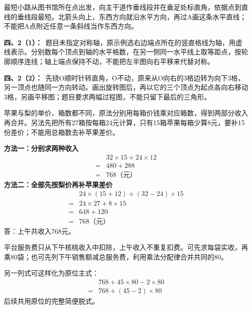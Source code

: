 \documentclass[multi=snippet,border=0pt]{standalone}
\newenvironment{snippet}[3]{\begin{minipage}{#1bp}\color{answerred}\fontsize{#2}{#3}\selectfont\raggedright}{\end{minipage}}
\begin{document}
\begin{snippet}{505}{11.5}{14}最短小路从图书馆所在点出发，向主干道作垂线段并在垂足处标直角，依据点到直线的垂线段最短。北箭头向上，东西方向就沿水平方向，再过A画这条水平直线；不能把A点附近任意一条斜线当作东西方向。\end{snippet}
\begin{snippet}{505}{11.5}{14}\textbf{四、2（1）：}\ 题目未指定对称轴，原示例选右边端点所在的竖直格线为轴，用虚线表示。分别数每个顶点到轴的水平格数，在另一侧同一水平线上取等距点，按轮廓顺序连线；轴上端点保持不动，不能把左半图向右平移来代替对称。\end{snippet}
\begin{snippet}{505}{11.5}{14}\textbf{四、2（2）：}\ 先绕O顺时针转直角，O不动，原来从O向右的3格边转为向下3格，另一顶点也随同一方向转动。画出旋转图后，再以它的三个顶点为起点各向右移动3格，另画平移图；题目要求两幅过程图，不能只留下最后的三角形。\end{snippet}
\begin{snippet}{505}{11.5}{14}苹果与梨的单价、箱数都不同，原法分别用每箱价钱乘对应箱数，得到两部分收入再合并。另法先把所有27箱按每箱24元计算，只有15箱苹果每箱少算8元，要补15份差价；不能用总箱数去补苹果差价。\par \textbf{方法一：分别求两种收入}\[\begin{aligned} &32\times15+24\times12\\={}&480+288\\={}&768\text{（元）}\end{aligned}\]\textbf{方法二：全部先按梨价再补苹果差价}\[\begin{aligned} &24\times(15+12)+(32-24)\times15\\={}&24\times27+8\times15\\={}&648+120\\={}&768\text{（元）}\end{aligned}\]答：上午共收入768元。\end{snippet}
\begin{snippet}{505}{11.5}{14}平台服务费只从下午核桃收入中扣除，上午收入不重复扣费。可先求每袋实收，再乘80袋；也可先列下午销售额减总服务费，利用乘法分配律合并共同的80。\par 另一列式可这样化为原位主式：\[\begin{aligned}&768+45\times80-2\times80\\={}&768+(45-2)\times80\end{aligned}\]后续共用原位的完整简便脱式。\end{snippet}
\end{document}
